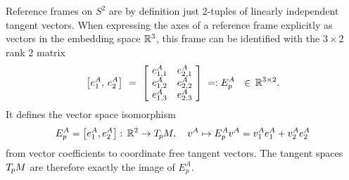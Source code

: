 Reference frames on $S^2$ are by definition just $2$-tuples of linearly independent tangent vectors.
When expressing the axes of a reference frame explicitly as vectors in the embedding space $\mathbb{R}^3$, this frame can be identified with the $3\times 2$ rank $2$ matrix
\begin{align}\label{eq:embedding_space_R3_frame}
    \big[ e_1^A,\, e_2^A \big]\ =\ 
    \left[\! \begin{array}{cc}
        e^A_{1,1} & e^A_{2,1} \\
        e^A_{1,2} & e^A_{2,2} \\
        e^A_{1,3} & e^A_{2,3}
    \end{array} \!\right]
    \; =: E^A_p
    \ \ \in\, \R^{3\times2} .
\end{align}
It defines the vector space isomorphism
\begin{align}
    E^A_p = \big[ e_1^A, e_2^A \big]:\, \mathbb{R}^2 \to T_{\mkern-1.5mu p}\mkern-.5muM,\ \ \ v^A \mapsto E^A_p v^A = v^A_1 e^A_1 + v^A_2 e^A_2
\end{align}
from vector coefficients to coordinate free tangent vectors.
The tangent spaces $T_{\mkern-1.5mu p}\mkern-.5muM$ are therefore exactly the image of $E^A_p$.


